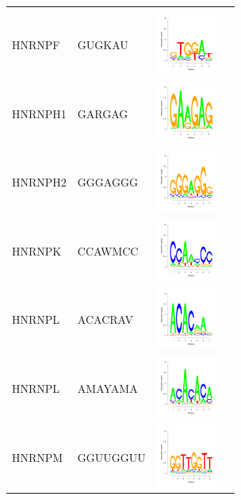 \documentclass[a4paper,10pt]{article}
\begin{document}
\begin{center}
\begin{longtable}{|l|l|l|p{6cm}|}
 &  \\
 \cline{1-3}
HNRNPF &  GUGKAU & \includegraphics[height=0.8in]{./seqLogo/HNRNPF_gugkau.pdf}
 &  \\
 \cline{1-3}
HNRNPH1 & GARGAG&  \includegraphics[height=0.8in]{./seqLogo/HNRNPH1_gargag.pdf}
 & \\
 \cline{1-3}
HNRNPH2 &  GGGAGGG & \includegraphics[height=0.8in]{./seqLogo/HNRNPH2_gggaggg.pdf}
 &  \\
 \cline{1-3}
HNRNPK & CCAWMCC &  \includegraphics[height=0.8in]{./seqLogo/HNRNPK_ccawmcc.pdf}
 &  \\
 \cline{1-3}
HNRNPL & ACACRAV &\includegraphics[height=0.8in]{./seqLogo/HNRNPL_acacrav.pdf}
   & \\
\cline{1-3}
HNRNPL & AMAYAMA & \includegraphics[height=0.8in]{./seqLogo/HNRNPL_amayama.pdf}
 & \\
 \cline{1-3}
HNRNPM & GGUUGGUU &  \includegraphics[height=0.8in]{./seqLogo/HNRNPM_gguugguu.pdf}

\end{longtable}
\end{center}
\end{document}
